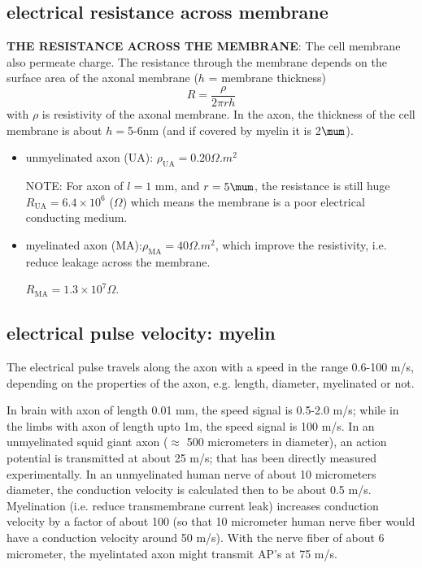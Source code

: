 \subsection{electrical resistance across membrane}

{\bf THE RESISTANCE ACROSS THE MEMBRANE}: The cell membrane also permeate
charge. The resistance through the membrane depends on the surface area of the
axonal membrane ($h$ = membrane thickness)
\begin{equation}
R = \frac{\rho}{2\pi r h}
\end{equation}
with $\rho$ is resistivity of the axonal membrane.
In the axon, the thickness of the cell membrane is about $h=$5-6nm  (and if
covered by myelin it is 2$\mum$).


\begin{itemize}
  \item unmyelinated axon (UA): $\rho_\text{UA}=0.20 \Omega.m^2$

NOTE: For axon of $l=1$ mm, and $r = 5\mum$, the resistance is still huge
$R_\text{UA}=6.4\times 10^6$ ($\Omega$) which means the membrane is a poor
electrical conducting medium.

   \item myelinated axon (MA):$\rho_\text{MA}=40 \Omega.m^2$, which 
   improve the resistivity, i.e. reduce leakage across the membrane.
  
$R_\text{MA}=1.3\times 10^7 \Omega$.
\end{itemize}


\subsection{electrical pulse velocity: myelin}
\label{sec:myelin-sheath}

The electrical pulse travels along the axon with a speed in the range 0.6-100
m/s, depending on the properties of the axon, e.g. length, diameter, myelinated
or not. 


In brain with axon of length 0.01 mm, the speed signal is 0.5-2.0 m/s;
while in the limbs with axon of length upto 1m, the speed signal is 100 m/s.
In an unmyelinated squid giant axon ($\approx$ 500 micrometers in diameter), an
action potential is transmitted at about 25 m/s; that has been directly measured
experimentally.  In an unmyelinated human nerve of about 10 micrometers
diameter, the conduction velocity is calculated then to be about 0.5 m/s.
Myelination (i.e. reduce transmembrane current leak) increases conduction
velocity by a factor of about 100 (so that 10 micrometer human nerve fiber would
have a conduction velocity around 50 m/s).
With the nerve fiber of about 6 micrometer, the myelintated axon might transmit
AP's at 75 m/s.

